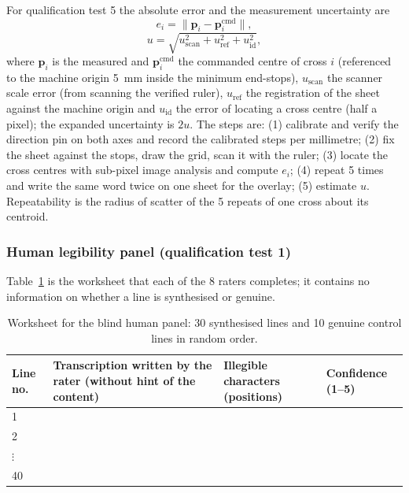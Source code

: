 For qualification test 5 the absolute error and the measurement uncertainty are
\begin{equation}
\label{eq:res-r5}
e_i=\lVert\mathbf{p}_i-\mathbf{p}_i^{\mathrm{cmd}}\rVert,
\end{equation}
\begin{equation}
\label{eq:res-unc}
u=\sqrt{u_{\mathrm{scan}}^2+u_{\mathrm{ref}}^2+u_{\mathrm{id}}^2},
\end{equation}
where $\mathbf{p}_i$ is the measured and $\mathbf{p}_i^{\mathrm{cmd}}$ the commanded centre of cross $i$ (referenced to the machine origin 5~mm inside the minimum end-stops), $u_{\mathrm{scan}}$ the scanner scale error (from scanning the verified ruler), $u_{\mathrm{ref}}$ the registration of the sheet against the machine origin and $u_{\mathrm{id}}$ the error of locating a cross centre (half a pixel); the expanded uncertainty is $2u$.
The steps are: (1) calibrate and verify the direction pin on both axes and record the calibrated steps per millimetre; (2) fix the sheet against the stops, draw the grid, scan it with the ruler; (3) locate the cross centres with sub-pixel image analysis and compute $e_i$; (4) repeat 5 times and write the same word twice on one sheet for the overlay; (5) estimate $u$.
Repeatability is the radius of scatter of the 5 repeats of one cross about its centroid.

\subsubsection{Human legibility panel (qualification test 1)}

Table~\ref{tab:res-panel} is the worksheet that each of the 8 raters completes; it contains no information on whether a line is synthesised or genuine.

\begin{table}[h]
\centering
\fontsize{10}{12}\selectfont
\begin{tabularx}{\linewidth}{|l|X|l|l|}
\hline
\textbf{Line no.} & \textbf{Transcription written by the rater (without hint of the content)} & \textbf{Illegible characters (positions)} & \textbf{Confidence (1--5)} \\
\hline
1 & & & \\
\hline
2 & & & \\
\hline
$\vdots$ & & & \\
\hline
40 & & & \\
\hline
\end{tabularx}
\caption{Worksheet for the blind human panel: 30 synthesised lines and 10 genuine control lines in random order.}
\label{tab:res-panel}
\end{table}

